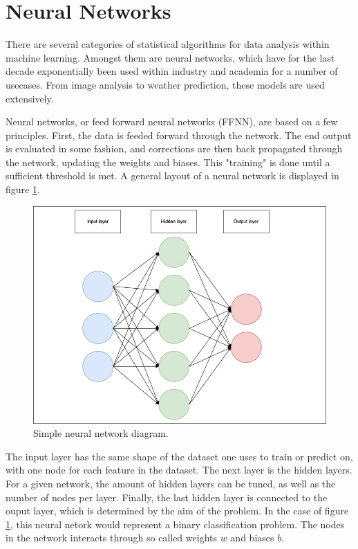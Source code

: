 \section*{Neural Networks}
There are several categories of statistical algorithms for data analysis within machine learning.
Amongst them are neural networks, which have for the last decade exponentially been used
within industry and academia for a number of usecases. From image analysis to weather prediction,
these models are used extensively. \par
Neural networks, or feed forward neural networks (FFNN), are based on a few principles.
First, the data is feeded forward through the network. The end output is evaluated in some fashion, 
and corrections are then back propagated through the network, updating the weights and biases. 
This "training" is done until a sufficient threshold is met. A general layout of a neural network is displayed in
figure \ref{fig:nndiagram}.

\begin{figure}
    \includegraphics[width=\linewidth]{Figures/Machinelearning/nn_diagram.jpeg}
    \caption{Simple neural network diagram.}
    \label{fig:nndiagram}
\end{figure}

The input layer has the same shape of the dataset one uses to train or predict on, with one node for each feature in the dataset.
The next layer is the hidden layers. For a given network, the amount of hidden layers can be tuned, as well as the number of 
nodes per layer. Finally, the last hidden layer is connected to the ouput layer, which is determined by the aim of the problem. 
In the case of figure \ref{fig:nndiagram}, this neural netork would represent a binary classification problem. The nodes in the
network interacts through so called weights $w$ and biases $b$. 